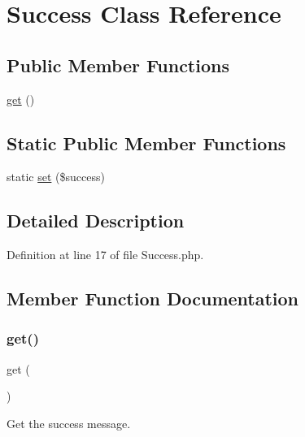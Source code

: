 \hypertarget{class_zest_1_1_auth_1_1_success}{}\section{Success Class Reference}
\label{class_zest_1_1_auth_1_1_success}
\subsection*{Public Member Functions}
\begin{DoxyCompactItemize}
\item 
\mbox{\hyperlink{class_zest_1_1_auth_1_1_success_ac33ee765f5ad9f134540bac393721cfe}{get}} ()
\end{DoxyCompactItemize}
\subsection*{Static Public Member Functions}
\begin{DoxyCompactItemize}
\item 
static \mbox{\hyperlink{class_zest_1_1_auth_1_1_success_ac81810b0f33b5e9d34a92bafd04fd85c}{set}} (\$success)
\end{DoxyCompactItemize}


\subsection{Detailed Description}


Definition at line 17 of file Success.\+php.



\subsection{Member Function Documentation}
\mbox{\label{class_zest_1_1_auth_1_1_success_ac33ee765f5ad9f134540bac393721cfe}} 
\subsubsection{\texorpdfstring{get()}{get()}}
{\footnotesize\ttfamily get (\begin{DoxyParamCaption}{ }\end{DoxyParamCaption})}

Get the success message.

